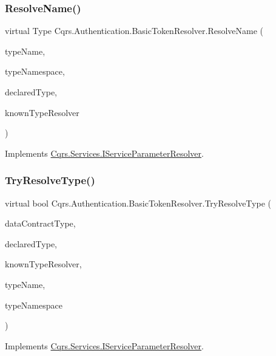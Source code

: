 \subsubsection{\texorpdfstring{Resolve\+Name()}{ResolveName()}}
{\footnotesize\ttfamily virtual Type Cqrs.\+Authentication.\+Basic\+Token\+Resolver.\+Resolve\+Name (\begin{DoxyParamCaption}\item[{string}]{type\+Name,  }\item[{string}]{type\+Namespace,  }\item[{Type}]{declared\+Type,  }\item[{Data\+Contract\+Resolver}]{known\+Type\+Resolver }\end{DoxyParamCaption})\hspace{0.3cm}{\ttfamily [virtual]}}



Implements \hyperlink{interfaceCqrs_1_1Services_1_1IServiceParameterResolver_a37c4b53616192e4e2f15ab4661ab99ae_a37c4b53616192e4e2f15ab4661ab99ae}{Cqrs.\+Services.\+I\+Service\+Parameter\+Resolver}.

\mbox{\label{classCqrs_1_1Authentication_1_1BasicTokenResolver_aee92bd9283bf949149a351c8d8cdb079_aee92bd9283bf949149a351c8d8cdb079}} 
\subsubsection{\texorpdfstring{Try\+Resolve\+Type()}{TryResolveType()}}
{\footnotesize\ttfamily virtual bool Cqrs.\+Authentication.\+Basic\+Token\+Resolver.\+Try\+Resolve\+Type (\begin{DoxyParamCaption}\item[{Type}]{data\+Contract\+Type,  }\item[{Type}]{declared\+Type,  }\item[{Data\+Contract\+Resolver}]{known\+Type\+Resolver,  }\item[{out Xml\+Dictionary\+String}]{type\+Name,  }\item[{out Xml\+Dictionary\+String}]{type\+Namespace }\end{DoxyParamCaption})\hspace{0.3cm}{\ttfamily [virtual]}}



Implements \hyperlink{interfaceCqrs_1_1Services_1_1IServiceParameterResolver_a31c82a00b192b877faff6df99e1b689b_a31c82a00b192b877faff6df99e1b689b}{Cqrs.\+Services.\+I\+Service\+Parameter\+Resolver}.


